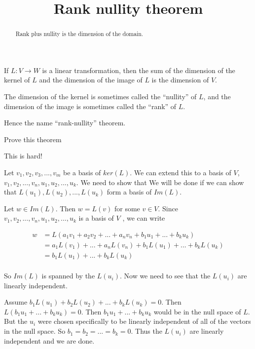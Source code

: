 \documentclass{ximera}
\title{Rank nullity theorem}
\begin{document}
\begin{abstract}
	Rank plus nullity is the dimension of the domain.
\end{abstract}


\begin{theorem}
	If $L:V \to W$ is a linear transformation, then the sum of the dimension of the kernel of $L$ and the dimension of the image of $L$ is the dimension of $V$.
 \end{theorem}
 
 The dimension of the kernel is sometimes called the ``nullity'' of
 $L$, and the dimension of the image is sometimes called the ``rank''
 of $L$.

Hence the name ``rank-nullity'' theorem.
 
 Prove this theorem
 
 \begin{warning}
 This is hard!
 \end{warning}
 
 \begin{free-response}
 	Let $v_1,v_2,v_3,...,v_m$ be a basis of $ker(L)$.  We can extend this to a basis of $V$, $v_1,v_2,...,v_n,u_1,u_2,...,u_k$.  We need to show that 
 	We will be done if we can show that $L(u_1),L(u_2),...,L(u_k)$ form a basis of $Im(L)$.
 	
 	Let $w \in Im(L)$.  Then $w = L(v)$ for some $v \in V$.  Since $v_1,v_2,...,v_n,u_1,u_2,...,u_k$ is a basis of $V$ , we can write
 	
 	\begin{align*}
 		w &= L( a_1v_1+a_2v_2+...+a_nv_n+b_1u_1+...+b_ku_k)\\
 			&=a_1L(v_1)+...+a_nL(v_n)+b_1L(u_1)+...+b_kL(u_k)\\
 			&=b_1L(u_1)+...+b_kL(u_k)\\
 	\end{align*}
 	
 	So $Im(L)$ is spanned by the $L(u_i)$.  Now we need to see that the $L(u_i)$ are linearly independent.
 	
 	Assume $b_1L(u_1)+b_2L(u_2)+...+b_kL(u_k) = 0$.  Then $L(b_1u_1+...+b_ku_k) = 0$.  Then $b_1u_1+...+b_ku_k$ would be in the null space of $L$.  But
 	the $u_i$ were chosen specifically to be linearly independent of all of the vectors in the null space.  So $b_1=b_2=...=b_k = 0$.   Thus the $L(u_i)$ are linearly independent
 	and we are done.
 \end{free-response}
\end{document}

